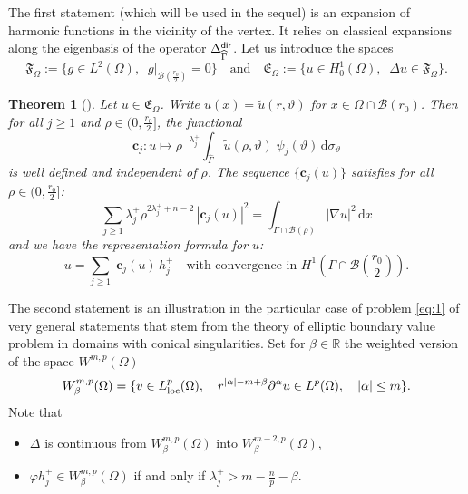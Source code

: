 \documentclass[titlepage,12pt]{amsart}
\newtheorem{theorem}{Theorem}[section]
\theoremstyle{definition}
\theoremstyle{remark}
\numberwithin{equation}{section}
\newcommand{\di}{\displaystyle}
\newcommand{\on}[1]{\big|_{#1}}
\newcommand\R{{\mathbb R}}
\newcommand{\sB}{{\mathscr B}}
\newcommand\bc{{\mathbf{c}}}
\newcommand{\rd}{{\mathrm d}}
\newcommand {\gE}{\mathfrak{E}}
\newcommand {\gF}{\mathfrak{F}}
\begin{document}
The first statement (which will be used in the sequel) is an expansion of harmonic functions in the vicinity of the vertex. It relies on classical expansions along the eigenbasis of the operator $\Delta^{\sf dir}_{\widehat\Gamma}$. Let us introduce the spaces
\begin{equation}
\label{eq:gF}
   \gF_\Omega := \{g \in L^2(\Omega) ,\;\; g\on{\sB(\frac{r_0}{2})}= 0\}
   \quad\mbox{and}\quad
   \gE_\Omega := \{u\in H^1_0(\Omega),\;\; \Delta u \in\gF_\Omega\}.
\end{equation} 

\begin{theorem}[\cite{CoDa2Mu:2024}]
\label{th:cj}
Let $u\in\gE_\Omega$.
Write $u(x) = \widetilde u(r,\vartheta)$ for $x\in\Omega\cap\sB(r_0)$.
Then for all $j\ge1$ and $\rho\in(0,\frac{r_0}{2}]$, the functional 
\begin{equation}
\label{eq:cjdef}
   \bc_j : u \mapsto \di\rho^{-\lambda^+_j}
   \int_{\widehat{\Gamma}} \widetilde u (\rho,\vartheta) \;\psi_j(\vartheta)\, \rd\sigma_{\vartheta}
\end{equation}
is well defined and independent of $\rho$. The sequence $\{\mathbf{c}_j(u)\}$ satisfies for all $\rho\in(0,\frac{r_0}{2}]$:
\begin{equation}
\label{eq:cj}
   \sum_{j \geq 1} \lambda^+_j \rho^{2\lambda^+_j+n-2}\,|\mathbf{c}_j(u)|^2
   = \int_{\Gamma\cap\sB(\rho)} |\nabla u|^2 \,\rd x
\end{equation}
and we have the representation formula for $u$:
\[
   u = \sum_{j \geq 1} \;\mathbf{c}_j(u) \,h^+_j \quad
   \mbox{with convergence in $H^1(\Gamma\cap{\sB(\frac{r_0}{2})})$.}
\]
\end{theorem}

The second statement is an illustration in the particular case of problem \eqref{eq:1} of very general statements that stem from the theory of elliptic boundary value problem in domains with conical singularities.
Set for $\beta\in\R$ the weighted version of the space $W^{m,p}(\Omega)$
\[
   W^{m,p}_\beta(\Omega) = \{v\in L^{p}_{\rm loc}(\Omega),\quad
   r^{|\alpha|-m+\beta} \partial^\alpha u\in L^p(\Omega),\quad |\alpha|\le m\}.
\]
Note that
\begin{itemize}
\item $\Delta$ is continuous from $W^{m,p}_\beta(\Omega)$  into $W^{m-2,p}_\beta(\Omega)$,
\item $\varphi h^+_j\in W^{m,p}_\beta(\Omega)$ \; if and only if \; $\lambda^+_j > m-\frac{n}{p}-\beta$.
\end{itemize}
\end{document}
